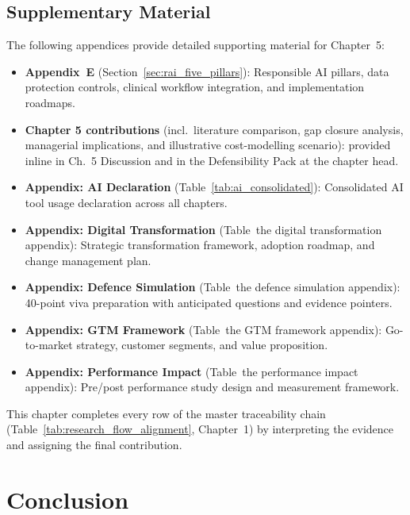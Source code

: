 
\subsection{Supplementary Material}

The following appendices provide detailed supporting material for Chapter~5:
\begin{itemize}[leftmargin=*, itemsep=2pt]
\item \textbf{Appendix~E} (Section~\ref{sec:rai_five_pillars}): Responsible AI pillars, data protection controls, clinical workflow integration, and implementation roadmaps.
\item \textbf{Chapter 5 contributions} (incl.\ literature comparison, gap closure analysis, managerial implications, and illustrative cost-modelling scenario): provided inline in Ch.~5 Discussion and in the Defensibility Pack at the chapter head.
\item \textbf{Appendix: AI Declaration} (Table~\ref{tab:ai_consolidated}): Consolidated AI tool usage declaration across all chapters.
\item \textbf{Appendix: Digital Transformation} (Table~the digital transformation appendix): Strategic transformation framework, adoption roadmap, and change management plan.
\item \textbf{Appendix: Defence Simulation} (Table~the defence simulation appendix): 40-point viva preparation with anticipated questions and evidence pointers.
\item \textbf{Appendix: GTM Framework} (Table~the GTM framework appendix): Go-to-market strategy, customer segments, and value proposition.
\item \textbf{Appendix: Performance Impact} (Table~the performance impact appendix): Pre/post performance study design and measurement framework.
\end{itemize}


\noindent This chapter completes every row of the master traceability chain (Table~\ref{tab:research_flow_alignment}, Chapter~1) by interpreting the evidence and assigning the final contribution.

\section{Conclusion}



